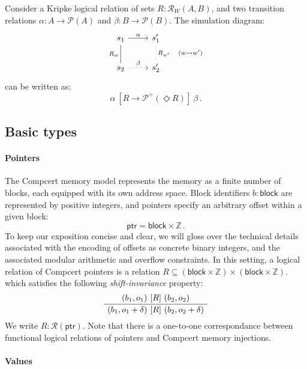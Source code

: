 \documentclass[acmsmall,anonymous]{acmart}
\newcommand{\kw}[1]{\ensuremath{ \textsf{#1} }}
\newcommand{\ifr}[1]{\ [{#1}]\ }
\begin{document}
\begin{example}
Consider a Kripke logical relation of sets $R : \mathcal{R}_W(A, B)$,
and two transition relations $\alpha : A \rightarrow \mathcal{P}(A)$
and $\beta : B \rightarrow \mathcal{P}(B)$.
The simulation diagram:
\[
  \begin{tikzcd}
    s_1 \arrow[r, "\alpha"]
        \arrow[d, dash, "R_w"'] &
    s_1' \arrow[d, dotted, dash, "R_{w'} \quad (w \leadsto w')"] \\
    s_2 \arrow[r, dotted, "\beta"] &
    s_2'
  \end{tikzcd}
\]
can be written as:
\[
  \alpha \ifr{R \rightarrow \mathcal{P}^+(\Diamond R)} \beta \,.
\]
\end{example}

\subsection{Basic types}

\paragraph{Pointers}

The Compcert memory model \cite{compcertmmv2}
represents the memory as a finite number of blocks,
each equipped with its own address space.
Block identifiers $b : \kw{block}$
are represented by positive integers,
and pointers specify an arbitrary offset within a given block:
\[
    \kw{ptr} = \kw{block} \times \mathbb{Z} \,.
\]
To keep our exposition concise and clear,
we will gloss over the technical details
associated with the encoding of offsets
as concrete binary integers,
and the associated modular arithmetic and overflow constraints.
In this setting,
a logical relation of Compcert pointers
is a relation $R \subseteq (\kw{block} \times \mathbb{Z}) \times (\kw{block} \times \mathbb{Z})$.
which satisfies the following \emph{shift-invariance} property:
\[
  \AxiomC{$(b_1, o_1) \ifr{R} (b_2, o_2)$}
  \UnaryInfC{$(b_1, o_1 + \delta) \ifr{R} (b_2, o_2 + \delta)$}
  \DisplayProof
\]
We write $R : \mathcal{R}(\kw{ptr})$.
Note that there is a one-to-one correspondance between
functional logical relations of pointers and
Compcert memory injections.

\paragraph{Values}
\end{document}
